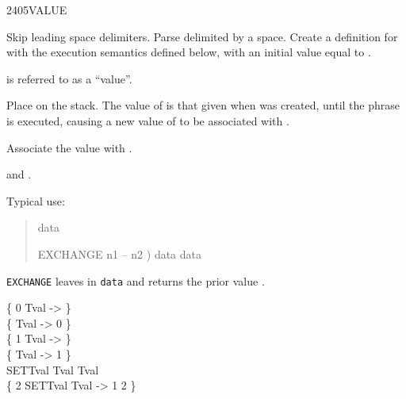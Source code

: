 \begin{worddef}{2405}{VALUE}
\item {}

	Skip leading space delimiters. Parse  delimited by
	a space. Create a definition for  with the execution
	semantics defined below, with an initial value equal to .

	 is referred to as a ``value''.

\execute[name]

	Place  on the stack. The value of  is that
	given when  was created, until the phrase 
	  is executed, causing a new value of
	 to be associated with .


	Associate the value  with .

\see {}
	and .

	\begin{defer}
	\rationale %
		Typical use:
		\begin{quote}  data

			\word{:} EXCHANGE  n1 -- n2 )
				data   data
			\word{;}
		\end{quote}
		\texttt{EXCHANGE} leaves  in \texttt{data} and
		returns the prior value .

	\testing
		\{ 0  Tval -> \} \\
		\{ Tval -> 0 \} \\

		\{ 1  Tval -> \} \\
		\{ Tval -> 1 \} \\

		\word{:} SETTval Tval   Tval \word{;} \\
		\{ 2 SETTval Tval -> 1 2 \}
	\end{defer}
\end{worddef}


